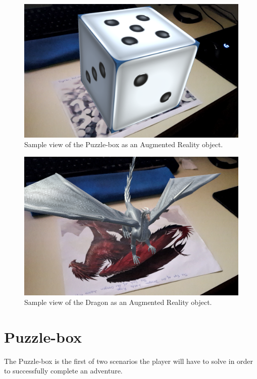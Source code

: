 \documentclass{sigchi-ext}
\begin{document}
\begin{figure}
	\centering
	\includegraphics[width=1\columnwidth]{figures/PM_AR_Box}
	\caption{Sample view of the Puzzle-box as an Augmented Reality object.}\label{fig:AR_Box1}
\end{figure}

\begin{figure}
	\centering
	\includegraphics[width=1\columnwidth]{figures/PM_AR_Dragon}
	\caption{Sample view of the Dragon as an Augmented Reality object.}\label{fig:AR_Dragon1}
\end{figure}

\section{Puzzle-box}

The Puzzle-box is the first of two scenarios the player will have to solve in order to successfully complete an adventure.
\end{document}

